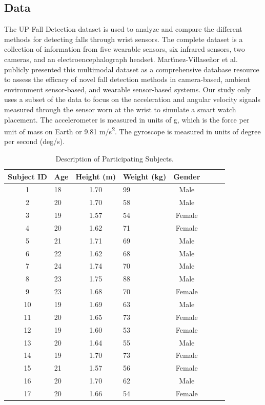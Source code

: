 \documentclass{llncs}
\begin{document}
\subsection{Data}

The UP-Fall Detection dataset is used to analyze and compare the different methods for detecting falls through wrist sensors. The complete dataset is a collection of information from five wearable sensors, six infrared sensors, two cameras, and an electroencephalograph headset. Mart{\'\i}nez-Villase{\~n}or et al. publicly presented this multimodal dataset as a comprehensive database resource to assess the efficacy of novel fall detection methods in camera-based, ambient environment sensor-based, and wearable sensor-based systems.\cite{martinez2019up} Our study only uses a subset of the data to focus on the acceleration and angular velocity signals measured through the sensor worn at the wrist to simulate a smart watch placement. The accelerometer is measured in units of g, which is the force per unit of mass on Earth or 9.81 m/s\textsuperscript{2}. The gyroscope is measured in units of degree per second (deg/s).
 
\begin{table}
	\begin{center}
		\caption{Description of Participating Subjects.}\label{table1}
		\begin{tabular}{clclclc|c}
			\toprule
			Subject ID & Age & Height (m) & Weight (kg) & Gender\\
			\midrule
			1 &  18 & 1.70 & 99 & Male\\
			2 &  20 & 1.70 & 58 & Male\\
			3 & 19 & 1.57 & 54 & Female\\
			4 & 20 & 1.62 & 71 & Female\\
			5 & 21 & 1.71 & 69 & Male\\
			6 & 22 & 1.62 & 68 & Male\\
			7 & 24 & 1.74 & 70 & Male\\
			8 & 23 & 1.75 & 88 & Male\\
			9 & 23 & 1.68 & 70 & Female\\
			10 & 19 & 1.69 & 63 & Male\\
			11 & 20 & 1.65 & 73 & Female\\
			12 & 19 & 1.60 & 53 & Female\\
			13 & 20 & 1.64 & 55 & Male\\
			14 & 19 & 1.70 & 73 & Female\\
			15 & 21 & 1.57 & 56 & Female\\
			16 & 20 & 1.70 & 62 & Male\\
			17 & 20 & 1.66 & 54 & Female\\
			\bottomrule
		\end{tabular}
	\end{center}
\end{table}
\end{document}
